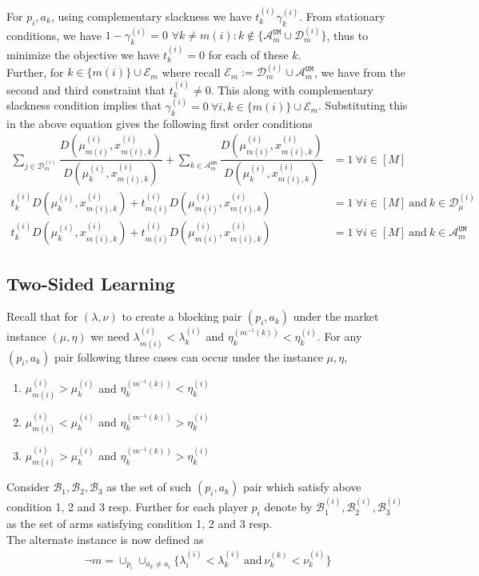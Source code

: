 \documentclass{article}
\begin{document}
For $p_i,a_k$, using complementary slackness we have $t^{(i)}_k\gamma^{(i)}_k$. From stationary conditions, we have $1-\gamma^{(i)}_{k}=0$  $\forall k\neq m(i): k\not\in\{\mathcal{A}^{\texttt{UM}}_m\cup \mathcal{D}_m^{(i)}\}$, thus to minimize the objective we have $t^{(i)}_k=0$ for each of these $k$. \\
Further, for $k\in \{m(i)\}\cup \mathcal{E}_{m}$ where recall $\mathcal{E}_m:=\mathcal{D}_m^{(i)}\cup\mathcal{A}^{\texttt{UM}}_m$, we have from the second and third constraint that $t^{(i)}_k\neq 0$. This along with complementary slackness condition implies that $\gamma^{(i)}_k=0 \ \forall i,k\in \{m(i)\}\cup \mathcal{E}_{m}$. Substituting this in the above equation gives the following first order conditions
\begin{align}
\sum_{j\in\mathcal{D}^{(i)}_{m}}\dfrac{D\left(\mu^{(i)}_{m(i)},x^{(i)}_{m(i),k}\right)}{D\left(\mu^{(i)}_{k},x^{(i)}_{m(i),k}\right)}+\sum_{k\in\mathcal{A}^{\texttt{UM}}_m}\dfrac{D\left(\mu^{(i)}_{m(i)},x^{(i)}_{m(i),k}\right)}{D\left(\mu^{(i)}_{k},x^{(i)}_{m(i),k}\right)}&=1 \ \forall i\in[M]\\
     t^{(i)}_{k}D\left(\mu^{(i)}_{k},x^{(i)}_{m(i),k}\right)+t^{(i)}_{m(i)}D\left(\mu^{(i)}_{m(i)},x^{(i)}_{m(i),k}\right)&=1 \ \forall i\in[M]\ \text{and}\ k\in\mathcal{D}^{(i)}_{\mu}\\
t^{(i)}_{k}D\left(\mu^{(i)}_{k},x^{(i)}_{m(i),k}\right)+t^{(i)}_{m(i)}D\left(\mu^{(i)}_{m(i)},x^{(i)}_{m(i),k}\right)&= 1 \ \forall i\in[M]\ \text{and}\ k\in\mathcal{A}^{\texttt{UM}}_m
\end{align}


\subsection{Two-Sided Learning}

Recall that for $(\lambda,\nu)$ to create a blocking pair $(p_i,a_k)$ under the market instance $(\mu,\eta)$ we need $\lambda^{(i)}_{m(i)}<\lambda^{(i)}_{k}$ and $\eta^{(m^{-1}(k))}_k<\eta^{(i)}_k$. For any $(p_i,a_k)$ pair following three cases can occur under the instance $\mu,\eta$, 
\begin{enumerate}
    \item $\mu^{(i)}_{m(i)}>\mu^{(i)}_{k}$ and $\eta^{(m^{-1}(k))}_{k}<\eta^{(i)}_{k}$
    \item $\mu^{(i)}_{m(i)}<\mu^{(i)}_{k}$ and $\eta^{(m^{-1}(k))}_{k}>\eta^{(i)}_{k}$
    \item $\mu^{(i)}_{m(i)}>\mu^{(i)}_{k}$ and $\eta^{(m^{-1}(k))}_{k}>\eta^{(i)}_{k}$
\end{enumerate}
Consider $\mathcal{B}_1,\mathcal{B}_2,\mathcal{B}_3$ as the set of such $(p_i,a_k)$ pair which satisfy above condition 1, 2 and 3 resp. Further for each player $p_i$ denote by $\mathcal{B}^{(i)}_1,\mathcal{B}^{(i)}_2,\mathcal{B}^{(i)}_3$ as the set of arms satisfying condition 1, 2 and 3 resp.\\
The alternate instance is now defined as 
\begin{align*}
    \neg m = \cup_{p_i}\cup_{a_k\neq a_i}\{\lambda^{(i)}_{i}<\lambda^{(i)}_{k}\ \text{and}\ \nu^{(k)}_{k}<\nu^{(i)}_{k}\}
\end{align*}
\end{document}
